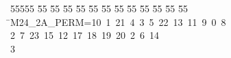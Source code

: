 %
%
\begin{tabbing}
55555 \= 55 \= 55 \= 55 \= 55 \= 55 \= 55 \= 55 \= 55 \= 55 \= 55 \= 55 \= 55 \= \>M24\_2A\_PERM=10\ 1\ 21\ 4\ 3\ 5\ 22\ 13\ 11\ 9\ 0\ 8\ \\[0pt]
2\ 7\ 23\ 15\ 12\ 17\ 18\ 19\ 20\ 2\ 6\ 14\\[0pt]
3\>\end{tabbing}
